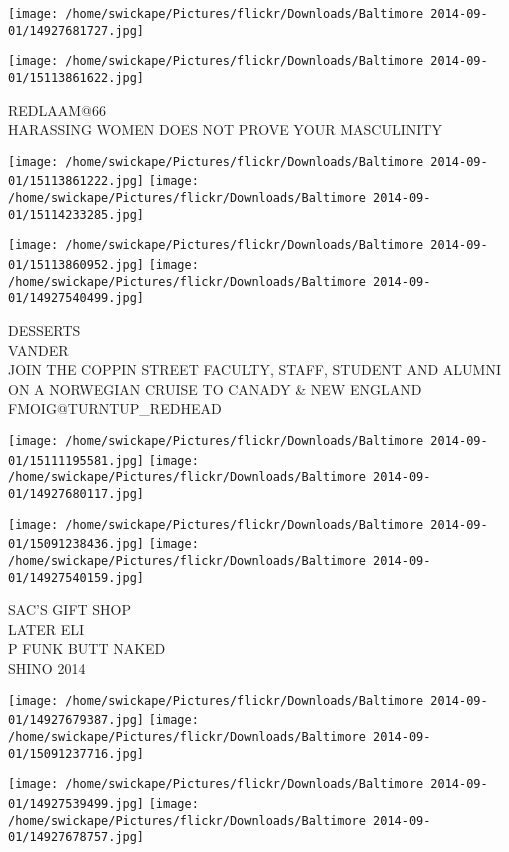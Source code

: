 \documentclass[10pt,letterpaper]{article}
\begin{document}
\texttt{[image: /home/swickape/Pictures/flickr/Downloads/Baltimore 2014-09-01/14927681727.jpg]}

\vspace{0.25in}
\texttt{[image: /home/swickape/Pictures/flickr/Downloads/Baltimore 2014-09-01/15113861622.jpg]}

REDLAAM@66\\
HARASSING WOMEN DOES NOT PROVE YOUR MASCULINITY
\pagebreak

\texttt{[image: /home/swickape/Pictures/flickr/Downloads/Baltimore 2014-09-01/15113861222.jpg]}
\texttt{[image: /home/swickape/Pictures/flickr/Downloads/Baltimore 2014-09-01/15114233285.jpg]}

\texttt{[image: /home/swickape/Pictures/flickr/Downloads/Baltimore 2014-09-01/15113860952.jpg]}
\texttt{[image: /home/swickape/Pictures/flickr/Downloads/Baltimore 2014-09-01/14927540499.jpg]}

DESSERTS\\
VANDER\\
JOIN THE COPPIN STREET FACULTY, STAFF, STUDENT AND ALUMNI ON A NORWEGIAN CRUISE TO CANADY \& NEW ENGLAND\\
FMOIG@TURNTUP\_REDHEAD
\pagebreak

\texttt{[image: /home/swickape/Pictures/flickr/Downloads/Baltimore 2014-09-01/15111195581.jpg]}
\texttt{[image: /home/swickape/Pictures/flickr/Downloads/Baltimore 2014-09-01/14927680117.jpg]}

\texttt{[image: /home/swickape/Pictures/flickr/Downloads/Baltimore 2014-09-01/15091238436.jpg]}
\texttt{[image: /home/swickape/Pictures/flickr/Downloads/Baltimore 2014-09-01/14927540159.jpg]}

SAC'S GIFT SHOP\\
LATER ELI\\
P FUNK BUTT NAKED\\
SHINO 2014
\pagebreak

\texttt{[image: /home/swickape/Pictures/flickr/Downloads/Baltimore 2014-09-01/14927679387.jpg]}
\texttt{[image: /home/swickape/Pictures/flickr/Downloads/Baltimore 2014-09-01/15091237716.jpg]}

\texttt{[image: /home/swickape/Pictures/flickr/Downloads/Baltimore 2014-09-01/14927539499.jpg]}
\texttt{[image: /home/swickape/Pictures/flickr/Downloads/Baltimore 2014-09-01/14927678757.jpg]}
\end{document}
